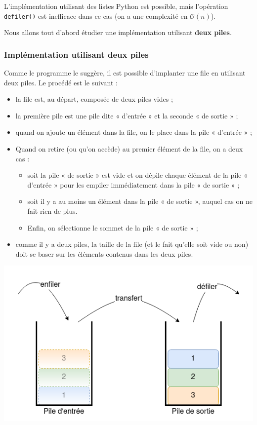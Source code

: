 \documentclass[
  letterpaper,
  DIV=11,
  numbers=noendperiod]{scrartcl}
\providecommand{\tightlist}{%
  \setlength{\itemsep}{0pt}\setlength{\parskip}{0pt}}\usepackage{longtable,booktabs,array}
\begin{document}
L'implémentation utilisant des listes Python est possible, mais
l'opération \texttt{defiler()} est inefficace dans ce cas (on a une
complexité en \(\mathcal{O}(n)\)).

Nous allons tout d'abord étudier une implémentation utilisant
\textbf{deux piles}.

\hypertarget{impluxe9mentation-utilisant-deux-piles}{%
\subsubsection{Implémentation utilisant deux
piles}\label{impluxe9mentation-utilisant-deux-piles}}

Comme le programme le suggère, il est possible d'implanter une file en
utilisant deux piles. Le procédé est le suivant :

\begin{itemize}
\item
  la file est, au départ, composée de deux piles vides ;
\item
  la première pile est une pile dite « d'entrée » et la seconde « de
  sortie » ;
\item
  quand on ajoute un élément dans la file, on le place dans la pile «
  d'entrée » ;
\item
  Quand on retire (ou qu'on accède) au premier élément de la file, on a
  deux cas :

  \begin{itemize}
  \tightlist
  \item
    soit la pile « de sortie » est vide et on dépile chaque élément de
    la pile « d'entrée » pour les empiler immédiatement dans la pile «
    de sortie » ;
  \item
    soit il y a au moins un élément dans la pile « de sortie », auquel
    cas on ne fait rien de plus.
  \item
    Enfin, on sélectionne le sommet de la pile « de sortie » ;
  \end{itemize}
\item
  comme il y a deux piles, la taille de la file (et le fait qu'elle soit
  vide ou non) doit se baser sur les éléments contenus dans les deux
  piles.
\end{itemize}

\includegraphics{file2piles.png}
\end{document}
